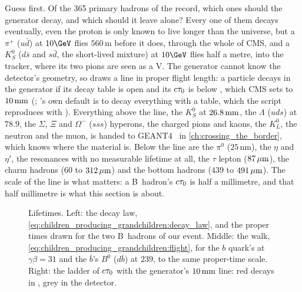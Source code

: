 Guess first. Of the 365 primary hadrons of the record, which ones should
the generator decay, and which should it leave alone? Every one of them
decays eventually, even the proton is only known to live longer than the
universe, but a $\pi^+$ ($u\bar d$) at $10\GeV$ flies $560\,\mathrm{m}$
before it does, through the whole of CMS, and a $K_S^0$ ($d\bar s$ and
$s\bar d$, the short-lived mixture) at $10\GeV$ flies half a metre, into
the tracker, where its two pions are seen as a V. The generator cannot
know the detector's geometry, so \PYTHIA draws a line in proper flight
length: a particle decays in the generator if its decay table is open and
its $c\tau_0$ is below , which CMS sets to
$10\,\mathrm{mm}$ (; \PYTHIA's own default is to decay
everything with a table, which the script reproduces with
). Everything above the line, the $K_S^0$ at
$26.8\,\mathrm{mm}$, the $\Lambda$ ($uds$) at $78.9$, the $\Sigma$, $\Xi$ and
$\Omega^-$ ($sss$) hyperons, the charged pions and kaons, the $K_L^0$, the
neutron and the muon, is handed to GEANT4~\cite{GEANT4:2002zbu} in
\cref{ch:crossing_the_border}, which knows where the material is. Below
the line are the $\pi^0$ ($25\,\mathrm{nm}$), the $\eta$ and $\eta'$, the
resonances with no measurable lifetime at all, the $\tau$ lepton
($87\,\mu\mathrm{m}$), the charm hadrons ($60$ to $312\,\mu\mathrm{m}$) and the bottom hadrons
($439$ to $491\,\mu\mathrm{m}$). The scale of the line is what matters: a B~hadron's
$c\tau_0$ is half a millimetre, and that half millimetre is what this
section is about.

\begin{figure}[htbp]\centering
\resizebox{\textwidth}{!}{}
\caption[The decay law, the walk and the ladder of lifetimes]{Lifetimes.
Left: the decay law, \cref{eq:children_producing_grandchildren:decay_law},
and the proper times drawn for the two B~hadrons of our event. Middle: the
walk, \cref{eq:children_producing_grandchildren:flight}, for the $b$
quark's \Bbar at $\gamma\beta=31$ and the $\bar b$'s $B^0$ ($d\bar b$) at
$239$, to the same proper-time scale. Right: the ladder of $c\tau_0$ with
the generator's $10\,\mathrm{mm}$ line: red decays in \PYTHIA, grey in the detector.}
\label{fig:children_producing_grandchildren:clock_sketch}
\end{figure}

